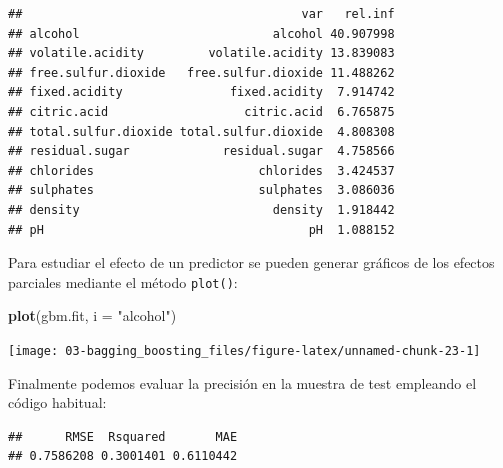 \documentclass[
]{book}
\newenvironment{Shaded}{\begin{snugshade}}{\end{snugshade}}
\newcommand{\CommentTok}[1]{\textcolor[rgb]{0.56,0.35,0.01}{\textit{#1}}}
\newcommand{\DataTypeTok}[1]{\textcolor[rgb]{0.13,0.29,0.53}{#1}}
\newcommand{\KeywordTok}[1]{\textcolor[rgb]{0.13,0.29,0.53}{\textbf{#1}}}
\newcommand{\NormalTok}[1]{#1}
\newcommand{\OperatorTok}[1]{\textcolor[rgb]{0.81,0.36,0.00}{\textbf{#1}}}
\newcommand{\StringTok}[1]{\textcolor[rgb]{0.31,0.60,0.02}{#1}}
\theoremstyle{break}
\theoremstyle{definition}
\theoremstyle{definition}
\theoremstyle{definition}
\theoremstyle{remark}
\begin{document}
\begin{verbatim}
##                                       var   rel.inf
## alcohol                           alcohol 40.907998
## volatile.acidity         volatile.acidity 13.839083
## free.sulfur.dioxide   free.sulfur.dioxide 11.488262
## fixed.acidity               fixed.acidity  7.914742
## citric.acid                   citric.acid  6.765875
## total.sulfur.dioxide total.sulfur.dioxide  4.808308
## residual.sugar             residual.sugar  4.758566
## chlorides                       chlorides  3.424537
## sulphates                       sulphates  3.086036
## density                           density  1.918442
## pH                                     pH  1.088152
\end{verbatim}

Para estudiar el efecto de un predictor se pueden generar gráficos de los efectos parciales mediante el método \texttt{plot()}:

\begin{Shaded}
\begin{Highlighting}[]
\KeywordTok{plot}\NormalTok{(gbm.fit, }\DataTypeTok{i =} \StringTok{"alcohol"}\NormalTok{)}
\end{Highlighting}
\end{Shaded}

\begin{center}\texttt{[image: 03-bagging\_boosting\_files/figure-latex/unnamed-chunk-23-1]} \end{center}

Finalmente podemos evaluar la precisión en la muestra de test empleando el código habitual:

\begin{Shaded}
\end{Shaded}

\begin{verbatim}
##      RMSE  Rsquared       MAE 
## 0.7586208 0.3001401 0.6110442
\end{verbatim}
\end{document}
